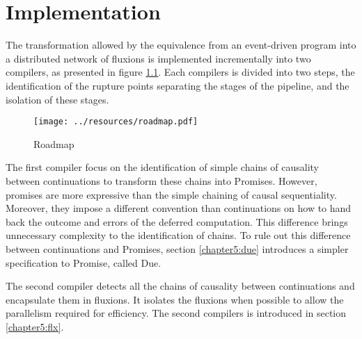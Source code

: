 \chapter{Implementation} \label{chapter5}
\minitoc
\eject
The transformation allowed by the equivalence from an event-driven program into a distributed network of fluxions is implemented incrementally into two compilers, as presented in figure \ref{fig:roadmap}.
Each compilers is divided into two steps, the identification of the rupture points separating the stages of the pipeline, and the isolation of these stages.

\begin{figure}[h!]
\begin{center}
\texttt{[image: ../resources/roadmap.pdf]}
\end{center}
\caption{Roadmap}
\label{fig:roadmap}
\end{figure}

The first compiler focus on the identification of simple chains of causality between continuations to transform these chains into Promises.
However, promises are more expressive than the simple chaining of causal sequentiality.
Moreover, they impose a different convention than continuations on how to hand back the outcome and errors of the deferred computation.
This difference brings unnecessary complexity to the identification of chains.
To rule out this difference between continuations and Promises, section \ref{chapter5:due} introduces a simpler specification to Promise, called Due.

The second compiler detects all the chains of causality between continuations and encapsulate them in fluxions.
It isolates the fluxions when possible to allow the parallelism required for efficiency.
The second compilers is introduced in section \ref{chapter5:flx}.




